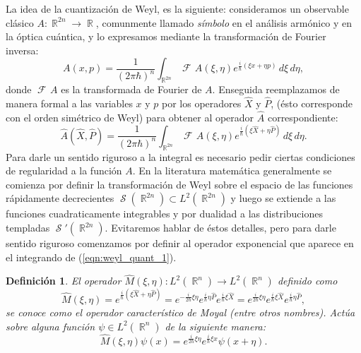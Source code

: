 \documentclass[a4paper]{report}
\DeclareMathOperator{\R}{\mathbb{R}}
\DeclareMathOperator{\Sz}{\mathcal S}
\DeclareMathOperator{\Fr}{\mathcal{F}\!}
\newtheorem{definition}{Definición}
\begin{document}
  La idea de la cuantización de Weyl, es la siguiente:
  consideramos un observable clásico $A : \R^{2n} \to \R$,
  comunmente llamado \textit{símbolo} en el análisis
  armónico y en la óptica cuántica, y lo expresamos mediante
  la transformación de Fourier inversa:
  \begin{equation}
    A(x,p)
    = \frac{1}{(2\pi\hbar)^{n}} \int_{\R^{2n}} \Fr A(\xi,
    \eta) e^{\frac{i}{\hbar} \left( \xi x + \eta p\right) }
    \, d\xi \, d\eta,
  \end{equation}
  donde $\Fr A$ es la transformada de Fourier de $A$.
  Enseguida reemplazamos de manera formal a las variables
  $x$ y $p$ por los operadores $\hat{X}$ y $\hat{P}$, (ésto
  corresponde con el orden simétrico de Weyl) para obtener
  al operador $\hat{A}$ correspondiente:
  \begin{equation}
    \label{eqn:weyl_quant_1}
    \hat{A}(\hat{X},\hat{P})
    = \frac{1}{(2\pi\hbar)^{n}} \int_{\R^{2n}} \Fr
    A(\xi,\eta) e^{\frac{i}{\hbar} \left( \xi \hat{X} + \eta
    \hat{P}\right) } \, d\xi \, d\eta.
  \end{equation}
  Para darle un sentido riguroso a la integral es necesario
  pedir ciertas condiciones de regularidad a la función $A$.
  En la literatura matemática generalmente se comienza por
  definir la transformación de Weyl sobre el espacio de las
  funciones rápidamente decrecientes $\Sz(\R^{2n}) \subset
  L^2(\R^{2n})$ y luego se extiende a las funciones
  cuadraticamente integrables y por dualidad a las
  distribuciones templadas $\Sz'(\R^{2n})$. Evitaremos
  hablar de éstos detalles, pero para darle sentido riguroso
  comenzamos por definir al operador exponencial que aparece
  en el integrando de (\ref{eqn:weyl_quant_1}).
  \begin{definition}
    El operador $\hat{M}(\xi, \eta) : L^2(\R^{n}) \to
    L^2(\R^{n})$ definido como
    \begin{equation*}
      \hat{M}(\xi,\eta)
      = e^{\frac{i}{\hbar} \left( \xi \hat{X} + \eta \hat{P}
      \right) }
      = e^{-\frac{i}{2\hbar} \xi \eta} e^{\frac{i}{\hbar}
      \eta \hat{P}} e^{\frac{i}{\hbar} \xi \hat{X}}
      = e^{\frac{i}{2\hbar} \xi \eta} e^{\frac{i}{\hbar}
      \xi \hat{X}} e^{\frac{i}{\hbar} \eta \hat{P}},
    \end{equation*} 
    se conoce como el operador característico de Moyal
    (entre otros nombres). Actúa sobre alguna función $\psi
    \in L^2(\R^{n})$ de la siguiente manera:
    \begin{equation}
      \hat{M}(\xi,\eta)\psi(x)
      = e^{\frac{i}{2\hbar} \xi\eta} e^{\frac{i}{\hbar} \xi
      x} \psi(x + \eta).
    \end{equation}
  \end{definition}
\end{document}
